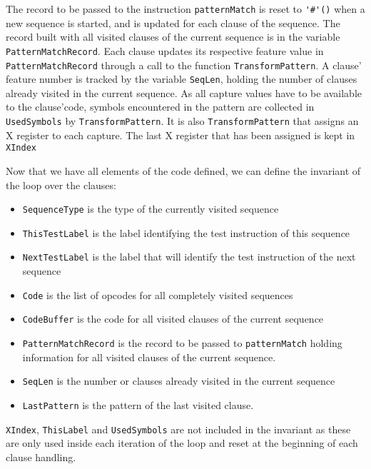 \documentclass[a4paper]{memoir}
\begin{document}
The record to be passed to the instruction \lstinline!patternMatch! is reset to
\lstinline!'#'()! when a new sequence is started, and is updated for each clause
of the sequence. The record built with all visited clauses of the current
sequence is in the variable \lstinline!PatternMatchRecord!.
Each clause updates its respective feature value in
\lstinline!PatternMatchRecord! through a call to the function \lstinline!TransformPattern!.
A clause' feature number is tracked by the
variable \lstinline!SeqLen!, holding the number of clauses already visited in
the current sequence.
As all capture values have to be available to the clause'code, symbols encountered
in the pattern are collected in \lstinline!UsedSymbols! by
\lstinline!TransformPattern!. It is also \lstinline!TransformPattern! that
assigns an X register to each capture. The last X register that has been
assigned is kept in \lstinline!XIndex!

Now that we have all elements of the code defined, we can define the invariant
of the loop over the clauses:

\begin{itemize}
  \item \lstinline!SequenceType! is the type of the currently visited sequence 
  \item \lstinline!ThisTestLabel! is the label identifying the test instruction of this sequence
  \item \lstinline!NextTestLabel! is the label that will identify the test
    instruction of the next sequence
  \item \lstinline!Code! is the list of opcodes for all completely visited sequences
  \item \lstinline!CodeBuffer! is the code for all visited clauses of the current sequence
  \item \lstinline!PatternMatchRecord! is the record to be passed to \lstinline!patternMatch!
        holding information for all visited clauses of the current sequence.
  \item \lstinline!SeqLen! is the number or clauses already visited in the current sequence
  \item \lstinline!LastPattern! is the pattern of the last visited clause.
\end{itemize}

\lstinline!XIndex!, \lstinline!ThisLabel! and \lstinline!UsedSymbols! are not
included in the invariant as these are only used inside
each iteration of the loop and reset at the beginning of each clause handling.
\end{document}
